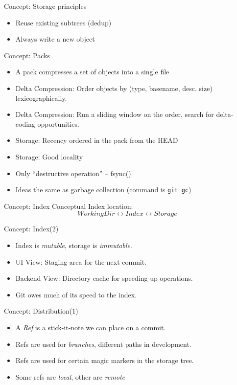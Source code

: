 \documentclass[xcolor=pdftex,dvipsnames]{beamer}
\begin{document}
\begin{frame}{Concept: Storage principles}
  \begin{itemize}
  \item Reuse existing subtrees (dedup)
  \item Always write a new object
  \end{itemize}
\end{frame}
\begin{frame}{Concept: Packs}
  \begin{itemize}
  \item A pack compresses a set of objects into a single file
  \item Delta Compression: Order objects by (type, basename,
    desc. size) lexicographically.
  \item Delta Compression: Run a sliding window on the order, search
    for delta-coding opportunities.
  \item Storage: Recency ordered in the pack from the HEAD
  \item Storage: Good locality
  \item Only ``destructive operation'' -- fsync()
  \item Ideas the same as garbage collection (command is \texttt{git gc})
  \end{itemize}
\end{frame}
\begin{frame}{Concept: Index}
Conceptual Index location:
$$
  WorkingDir \leftrightarrow Index \leftrightarrow Storage
$$
\end{frame}
\begin{frame}{Concept: Index(2)}
  \begin{itemize}
  \item Index is \emph{mutable}, storage is \emph{immutable}.
  \item UI View: Staging area for the next commit.
  \item Backend View: Directory cache for speeding up operations.
  \item Git owes much of its speed to the index.
  \end{itemize}
\end{frame}
\begin{frame}{Concept: Distribution(1)}
  \begin{itemize}
  \item A \emph{Ref} is a stick-it-note we can place on a commit.
  \item Refs are used for \emph{branches}, different paths in development.
  \item Refs are used for certain magic markers in the storage tree.
  \item Some refs are \emph{local}, other are \emph{remote}
  \end{itemize}
\end{frame}
\end{document}
